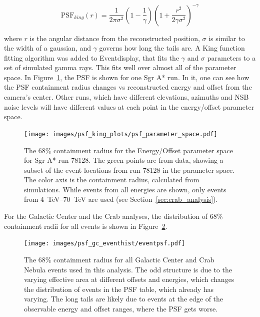     \begin{equation} \label{eqn:king}
    \text{PSF}_{king}(r) = \frac{1}{2 \pi \sigma^{2} } \left( 1 - \frac{1}{\gamma} \right) \left( 1 + \frac{ r^{2} }{ 2 \gamma \sigma^{2} } \right)^{-\gamma}
    \end{equation}

    where $r$ is the angular distance from the reconstructed position, $\sigma$ is similar to the width of a gaussian, and $\gamma$ governs how long the tails are.
    A King function fitting algorithm was added to Eventdisplay, that fits the $\gamma$ and $\sigma$ parameters to a set of simulated gamma rays.
    This fits well over almost all of the parameter space.
    In Figure~\ref{fig:psf_paramspace}, the PSF is shown for one Sgr A* run.
    In it, one can see how the PSF containment radius changes vs reconstructed energy and offset from the camera's center.
    Other runs, which have different elevations, azimuths and NSB noise levels will have different values at each point in the energy/offset parameter space.

    \begin{figure}[ht]
      \centering
      \texttt{[image: images/psf\_king\_plots/psf\_parameter\_space.pdf]}
      \caption[PSF Parameter Space]{
        The 68\% containment radius for the Energy/Offset parameter space for Sgr A* run 78128. 
        The green points are from data, showing a subset of the event locations from run 78128 in the parameter space.
        The color axis is the containment radius, calculated from simulations.
        While events from all energies are shown, only events from \SIrange{4}{70}{\TeV} are used (see Section~\ref{sec:crab_analysis}).
      }
      \label{fig:psf_paramspace}
    \end{figure}

    For the Galactic Center and the Crab analyses, the distribution of 68\% containment radii for all events is shown in Figure~\ref{fig:gc_psf_hist}.

    \begin{figure}[ht]
      \centering
      \texttt{[image: images/psf\_gc\_eventhist/eventpsf.pdf]}
      \caption[Crab and Galactic Center Event PSFs]{
        The 68\% containment radius for all Galactic Center and Crab Nebula events used in this analysis.
        The odd structure is due to the varying effective area at different offsets and energies, which changes the distribution of events in the PSF table, which already has varying.
        The long tails are likely due to events at the edge of the observable energy and offset ranges, where the PSF gets worse.
      }
      \label{fig:gc_psf_hist}
    \end{figure}
  
